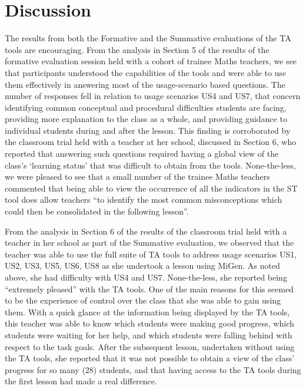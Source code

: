 
\section{Discussion}
\label{sec:discussion}

The results from both the Formative and the Summative evaluations of
the TA tools are encouraging. From the analysis in Section 5 of the results 
of the formative evaluation session held with a cohort of trainee Maths teachers,
we see that participants understood the capabilities of
the tools and were able to use them effectively in answering most
of the usage-scenario based questions. 
The number of responses fell in relation to usage scenarios US4 and US7, 
that concern identifying common conceptual and procedural difficulties
students are facing, 
providing more explanation to the class as a whole, and 
providing guidance to individual students during and after the lesson.
This finding is corroborated by the 
classroom trial held with a teacher at her school, discussed in Section 6,
who reported that answering such questions
required having a global view of the class's `learning status' 
that was difficult to obtain from the tools.
None-the-less, we were pleased to see that a small number of the 
trainee Maths teachers commented that being able to view the occurrence 
of all the indicators in the ST tool does allow teachers
``to identify the most common misconceptions which could then be
consolidated in the following lesson''. 


From the analysis in Section 6 of the results of the classroom trial held with a
teacher in her school as part of the Summative evaluation,
we observed that the teacher was able to use the full suite of TA
tools to address usage scenarios US1, US2, US3, US5, US6, US8 as she undertook a
lesson using MiGen. As noted above, she had difficulty with US4 and US7.
None-the-less, she reported being ``extremely pleased'' with the TA tools. 
One of the main reasons for this seemed to be the experience of control over the class
that she was able to gain using them. With a quick glance at the information being
displayed by the TA tools, this teacher was able to know which students
were making good progress, which students were waiting for her help,
and which students were falling behind with respect to the task goals.
After the subsequent lesson, undertaken without using the TA tools,
she reported that it was not possible to obtain a view
of the class' progress for so many (28) students, 
and that having access to the TA tools during the first lesson 
had made a real difference. 

